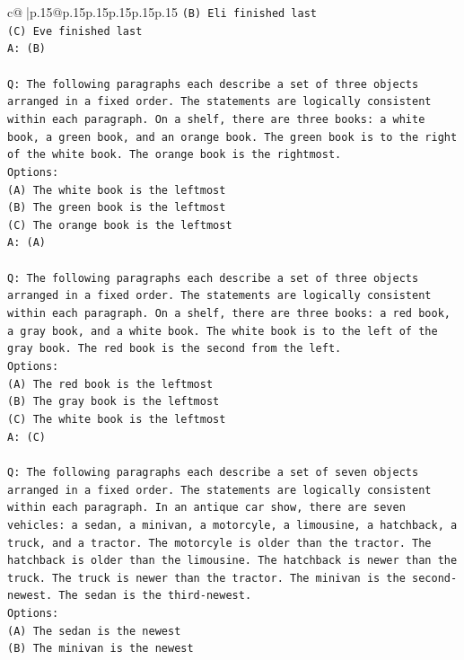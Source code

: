 \documentclass{article}
\begin{document}
{\begin{supertabular}{c@{$\;$}|p{.15\linewidth}@{}p{.15\linewidth}p{.15\linewidth}p{.15\linewidth}p{.15\linewidth}p{.15\linewidth}}
{{{\texttt{(B) Eli finished last} \\
\texttt{(C) Eve finished last} \\
\texttt{A: (B)} \\
\\ 
\texttt{Q: The following paragraphs each describe a set of three objects arranged in a fixed order. The statements are logically consistent within each paragraph. On a shelf, there are three books: a white book, a green book, and an orange book. The green book is to the right of the white book. The orange book is the rightmost.} \\
\texttt{Options:} \\
\texttt{(A) The white book is the leftmost} \\
\texttt{(B) The green book is the leftmost} \\
\texttt{(C) The orange book is the leftmost} \\
\texttt{A: (A)} \\
\\ 
\texttt{Q: The following paragraphs each describe a set of three objects arranged in a fixed order. The statements are logically consistent within each paragraph. On a shelf, there are three books: a red book, a gray book, and a white book. The white book is to the left of the gray book. The red book is the second from the left.} \\
\texttt{Options:} \\
\texttt{(A) The red book is the leftmost} \\
\texttt{(B) The gray book is the leftmost} \\
\texttt{(C) The white book is the leftmost} \\
\texttt{A: (C)} \\
\\ 
\texttt{Q: The following paragraphs each describe a set of seven objects arranged in a fixed order. The statements are logically consistent within each paragraph. In an antique car show, there are seven vehicles: a sedan, a minivan, a motorcyle, a limousine, a hatchback, a truck, and a tractor. The motorcyle is older than the tractor. The hatchback is older than the limousine. The hatchback is newer than the truck. The truck is newer than the tractor. The minivan is the second{-}newest. The sedan is the third{-}newest.} \\
\texttt{Options:} \\
\texttt{(A) The sedan is the newest} \\
\texttt{(B) The minivan is the newest} \\
}}}
\end{supertabular}}
\end{document}
